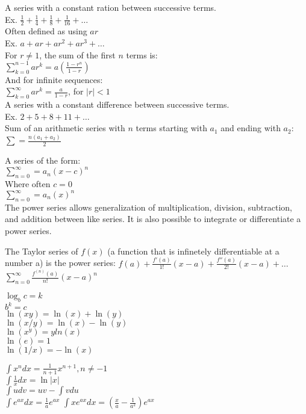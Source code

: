 
A series with a constant ration between successive terms.\\
Ex.  $\frac{1}{2}+ \frac{1}{4}+ \frac{1}{8}+ \frac{1}{16}+\ldots$\\
Often defined as using $ar$\\
Ex.  $a+ar+ar^2+ar^3+\ldots$\\
For $r\neq1$, the sum of the first $n$ terms is:\\
$\sum_{k=0}^{n-1}ar^k=a(\frac{1-r^n}{1-r})$\\
And for infinite sequences:\\
$\sum_{k=0}^{\infty}ar^k=\frac{a}{1-r}$, for $|r|<1$\\

A series with a constant difference between successive terms.\\
Ex.  $2+5+8+11+\ldots$\\
Sum of an arithmetic series with $n$ terms starting with $a_1$ and ending with $a_2$:\\
$\sum=\frac{n(a_1+a_2)}{2}$

A series of the form:\\
$\sum_{n=0}^{\infty}=a_n{(x-c)}^n$\\
Where often $c=0$\\
$\sum_{n=0}^{\infty}=a_n{(x)}^n$\\
The power series allows generalization of multiplication, division, subtraction, and addition between 
like series. It is also possible to integrate or differentiate a power series.


The Taylor series of $f(x)$ (a function that is infinetely differentiable at a number a) is the
power series:
$f(a)+\frac{f'(a)}{1!}(x-a)+\frac{f''(a)}{2!}(x-a)+\ldots$
$\sum_{n=0}^\infty\frac{f^{(n)}(a)}{n!}{(x-a)}^n $

$\log_b c=k$\\
$b^k=c$\\
$\ln(xy)=\ln(x)+\ln(y)$\\
$\ln(x/y)=\ln(x)-\ln(y)$\\
$\ln(x^y)=yln(x)$\\
$\ln(e)=1$\\
$\ln(1/x)=-\ln(x)$

$\int x^n dx = \frac{1}{n+1}x^{n+1},n\neq-1$\\
$\int \frac{1}{x} dx = \ln|x|$\\
$\int u dv=uv-\int v du$\\
$\int e^{ax}dx=\frac{1}{a}e^{ax}$
$\int xe^{ax}dx=(\frac{x}{a}-\frac{1}{a^2})e^{ax}$

